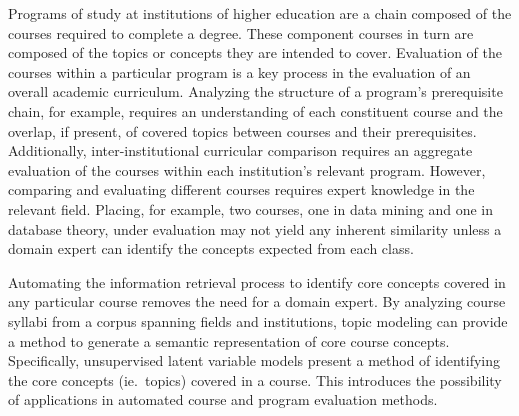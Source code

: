 Programs of study at institutions of higher education are a chain composed
of the courses required to complete a degree. These component courses in
turn are composed of the topics or concepts they are intended to cover.
Evaluation of the courses within a particular program is a key process in
the evaluation of an overall academic curriculum. Analyzing the structure
of a program's prerequisite chain, for example, requires an understanding
of each constituent course and the overlap, if present, of covered topics
between courses and their prerequisites. Additionally, inter-institutional
curricular comparison requires an aggregate evaluation of the courses
within each institution's relevant program. However, comparing and
evaluating different courses requires expert knowledge in the relevant
field. Placing, for example, two courses, one in data mining and one in
database theory, under evaluation may not yield any inherent similarity
unless a domain expert can identify the concepts expected from each class.

Automating the information retrieval process to identify core concepts
covered in any particular course removes the need for a domain expert. By
analyzing course syllabi from a corpus spanning fields and institutions,
topic modeling can provide a method to generate a semantic representation
of core course concepts. Specifically, unsupervised latent variable models
present a method of identifying the core concepts (ie.\ topics) covered in
a course. This introduces the possibility of applications in automated
course and program evaluation methods.
